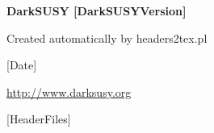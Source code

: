 \documentclass[a4paper,10pt]{book}
\begin{document}
\centerline{}

\vspace{2cm}

\centerline{\LARGE \bfseries DarkSUSY [DarkSUSYVersion]}

\bigskip
\bigskip

\centerline{\Huge \bfseries \sffamily [Title]}

\vspace{1.5cm}

\centerline{\large Created automatically by headers2tex.pl}
\smallskip

\centerline{[Date]}

\bigskip

\centerline{\url{http://www.darksusy.org}{}}

\bigskip

[HeaderFiles]

\newpage

\tableofcontents

\end{document}
